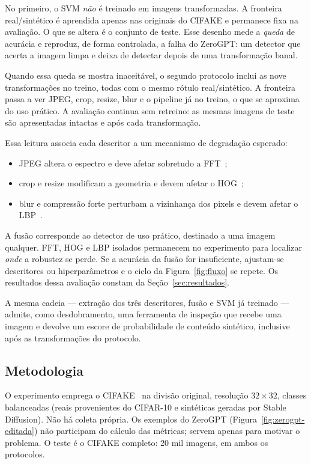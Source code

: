 \documentclass[12pt]{article}
\begin{document}
No primeiro, o SVM \emph{não} é treinado em imagens transformadas. A fronteira real/sintético é aprendida apenas nas originais do CIFAKE e permanece fixa na avaliação. O que se altera é o conjunto de teste. Esse desenho mede a \emph{queda} de acurácia e reproduz, de forma controlada, a falha do ZeroGPT: um detector que acerta a imagem limpa e deixa de detectar depois de uma transformação banal.

Quando essa queda se mostra inaceitável, o segundo protocolo inclui as nove transformações no treino, todas com o mesmo rótulo real/sintético. A fronteira passa a ver JPEG, crop, resize, blur e o pipeline já no treino, o que se aproxima do uso prático. A avaliação continua sem retreino: as mesmas imagens de teste são apresentadas intactas e após cada transformação.

Essa leitura associa cada descritor a um mecanismo de degradação esperado:

\begin{itemize}
\item JPEG altera o espectro e deve afetar sobretudo a FFT~\cite{bammey2024synthbuster};
\item crop e resize modificam a geometria e devem afetar o HOG~\cite{choi2025warpad,dalal2005hog};
\item blur e compressão forte perturbam a vizinhança dos pixels e devem afetar o LBP~\cite{ojala2002lbp}.
\end{itemize}

A fusão corresponde ao detector de uso prático, destinado a uma imagem qualquer. FFT, HOG e LBP isolados permanecem no experimento para localizar \emph{onde} a robustez se perde. Se a acurácia da fusão for insuficiente, ajustam-se descritores ou hiperparâmetros e o ciclo da Figura~\ref{fig:fluxo} se repete. Os resultados dessa avaliação constam da Seção~\ref{sec:resultados}.

A mesma cadeia --- extração dos três descritores, fusão e SVM já treinado --- admite, como desdobramento, uma ferramenta de inspeção que recebe uma imagem e devolve um escore de probabilidade de conteúdo sintético, inclusive após as transformações do protocolo.

\subsection{Metodologia}

O experimento emprega o CIFAKE~\cite{bird2024cifake} na divisão original, resolução $32{\times}32$, classes balanceadas (reais provenientes do CIFAR-10 e sintéticas geradas por Stable Diffusion). Não há coleta própria. Os exemplos do ZeroGPT (Figura~\ref{fig:zerogpt-editada}) não participam do cálculo das métricas; servem apenas para motivar o problema. O teste é o CIFAKE completo: 20 mil imagens, em ambos os protocolos.
\end{document}

